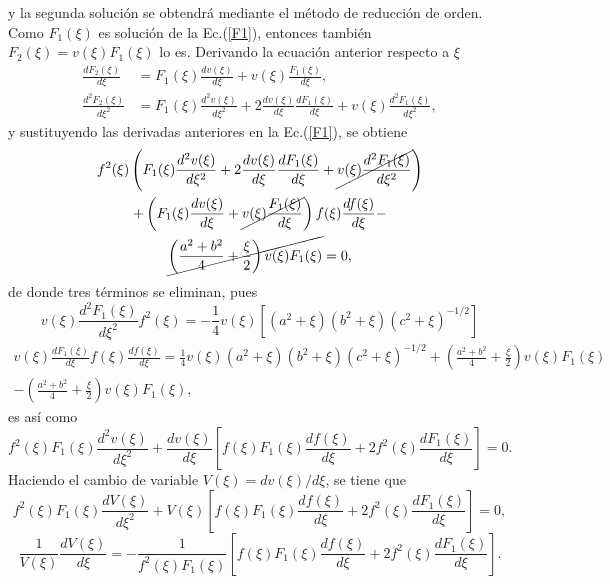 y la segunda solución se obtendrá mediante el método de reducción de orden. Como $F_1(\xi)$ es solución de la Ec.(\ref{F1}), entonces también 
$F_2(\xi)=v(\xi)F_1(\xi)$ lo es. Derivando la ecuación anterior respecto a $\xi$
\begin{align}
    \frac{dF_2(\xi)}{d\xi}&=F_1(\xi)\frac{dv(\xi)}{d\xi}+v(\xi)\frac{F_1(\xi)}{d\xi},\\
    \frac{d^2F_2(\xi)}{d\xi^2}&=F_1(\xi)\frac{d^2v(\xi)}{d\xi^2}+2\frac{dv(\xi)}{d\xi}\frac{dF_1(\xi)}{d\xi}+v(\xi)\frac{d^2F_1(\xi)}{d\xi^2},
\end{align}
y sustituyendo las derivadas anteriores en la Ec.(\ref{F1}), se obtiene
\begin{multline}
    f^2(\xi)\left(F_1(\xi)\frac{d^2v(\xi)}{d\xi^2}+2\frac{dv(\xi)}{d\xi}\frac{dF_1(\xi)}{d\xi}+\cancel{v(\xi)\frac{d^2F_1(\xi)}{d\xi^2}}\right)\\+\left(F_1(\xi)\frac{dv(\xi)}{d\xi}+\cancel{v(\xi)\frac{F_1(\xi)}{d\xi}}\right)f(\xi)\frac{df(\xi)}{d\xi}-
    \\ \cancel{\left(\frac{a^2+b^2}{4}+\frac{\xi}{2}\right)v(\xi)F_1(\xi)}=0,
\end{multline}
de donde tres términos se eliminan, pues
\begin{equation*}
    v(\xi)\frac{d^2F_1(\xi)}{d\xi^2}f^2(\xi)=-\frac{1}{4}v(\xi)[(a^2+\xi)(b^2+\xi)(c^2+\xi)^{-1/2}]
\end{equation*}
\begin{multline*}
    v(\xi)\frac{dF_1(\xi)}{d\xi}f(\xi)\frac{df(\xi)}{d\xi}=\frac{1}{4}v(\xi)(a^2+\xi)(b^2+\xi)(c^2+\xi)^{-1/2}+\left(\frac{a^2+b^2}{4}+\frac{\xi}{2}\right)v(\xi)F_1(\xi)\\-\left(\frac{a^2+b^2}{4}+\frac{\xi}{2}\right)v(\xi)F_1(\xi),
\end{multline*}
es así como
\begin{equation*}
    f^2(\xi)F_1(\xi)\frac{d^2v(\xi)}{d\xi^2}+\frac{dv(\xi)}{d\xi}\left[f(\xi)F_1(\xi)\frac{df(\xi)}{d\xi}+2f^2(\xi)\frac{dF_1(\xi)}{d\xi}\right]=0.
\end{equation*}
Haciendo el cambio de variable $V(\xi)=dv(\xi)/d\xi$, se tiene que
\begin{equation*}
    f^2(\xi)F_1(\xi)\frac{dV(\xi)}{d\xi^2}+V(\xi)\left[f(\xi)F_1(\xi)\frac{df(\xi)}{d\xi}+2f^2(\xi)\frac{dF_1(\xi)}{d\xi}\right]=0,    
\end{equation*}
\begin{equation*}
    \frac{1}{V(\xi)}\frac{dV(\xi)}{d\xi}=-\frac{1}{f^2(\xi)F_1(\xi)}\left[f(\xi)F_1(\xi)\frac{df(\xi)}{d\xi}+2f^2(\xi)\frac{dF_1(\xi)}{d\xi}\right].
\end{equation*}
